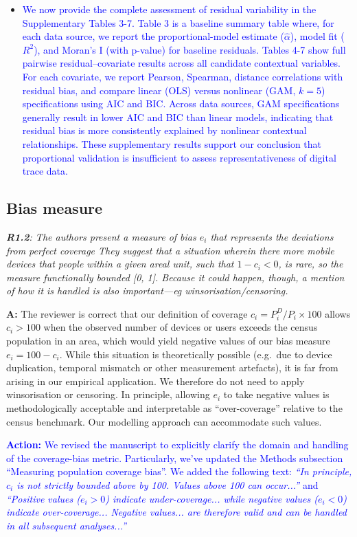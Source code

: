 \documentclass[
  letterpaper,
  DIV=11,
  numbers=noendperiod]{scrartcl}
\begin{document}
\begin{itemize}[noitemsep, topsep=0pt]
\item \textcolor{blue}{We now provide the complete assessment of residual variability in the Supplementary Tables 3-7. Table 3 is a baseline summary table where, for each data source, we report the proportional-model estimate ($\hat{\alpha}$), model fit ($R^2$), and Moran’s I (with p-value) for baseline residuals. Tables 4-7 show full pairwise residual–covariate results across all candidate contextual variables. For each covariate, we report Pearson, Spearman, distance correlations with residual bias, and compare linear (OLS) versus nonlinear (GAM, $k = 5$) specifications using AIC and BIC. Across data sources, GAM specifications generally result in lower AIC and BIC than linear models, indicating that residual bias is more consistently explained by nonlinear contextual relationships. These supplementary results support our conclusion that proportional validation is insufficient to assess representativeness of digital trace data.}
\end{itemize}

\subsection{Bias measure}

\setlength{\leftskip}{0cm}\textit{\textbf{R1.2}: The authors present a measure of bias $e_i$ that represents the deviations from perfect coverage They suggest that a situation wherein there more mobile devices that people within a given areal unit, such that $1 - c_i < 0$, is rare, so the measure functionally bounded [0, 1]. Because it could happen, though, a mention of how it is handled is also important—eg winsorisation/censoring.}

\setlength{\leftskip}{0.5cm}\textbf{A:} The reviewer is correct that our
definition of coverage \(c_i = P_i^D/P_i \times 100\) allows \(c_i>100\)
when the observed number of devices or users exceeds the census
population in an area, which would yield negative values of our bias
measure \(e_i = 100-c_i\). While this situation is theoretically
possible (e.g.~due to device duplication, temporal mismatch or other
measurement artefacts), it is far from arising in our empirical
application. We therefore do not need to apply winsorisation or
censoring. In principle, allowing \(e_i\) to take negative values is
methodologically acceptable and interpretable as ``over-coverage''
relative to the census benchmark. Our modelling approach can accommodate
such values.

\setlength{\leftskip}{0.5cm}\textcolor{blue}{\textbf{Action:} We revised the manuscript to explicitly clarify the domain and handling of the coverage-bias metric. Particularly, we've updated the Methods subsection ``Measuring population coverage bias''. We added the following text:
\textit{``In principle, $c_i$ is not strictly bounded above by 100. Values above 100 can occur...''} and 
\textit{``Positive values ($e_i>0$) indicate under-coverage... while negative values ($e_i<0$) indicate over-coverage... Negative values... are therefore valid and can be handled in all subsequent analyses...''}}
\end{document}
